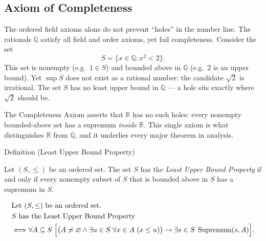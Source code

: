 \subsection*{Axiom of Completeness}


\begin{remark*}
The ordered field axioms alone do not prevent ``holes'' in the number line.
The rationals $\mathbb{Q}$ satisfy all field and order axioms, yet fail
completeness. Consider the set
\[
S = \{x \in \mathbb{Q} : x^2 < 2\}.
\]
This set is nonempty (e.g.\ $1 \in S$) and bounded above in $\mathbb{Q}$
(e.g.\ $2$ is an upper bound). Yet $\sup S$ does not exist as a rational
number: the candidate $\sqrt{2}$ is irrational. The set $S$ has no least
upper bound in $\mathbb{Q}$ --- a hole sits exactly where $\sqrt{2}$ should be.

The Completeness Axiom asserts that $\mathbb{R}$ has no such holes:
every nonempty bounded-above set has a supremum \emph{inside} $\mathbb{R}$.
This single axiom is what distinguishes $\mathbb{R}$ from $\mathbb{Q}$,
and it underlies every major theorem in analysis.
\end{remark*}


\begin{definitionbox}{Definition (Least Upper Bound Property)}
\begin{definition}
\label{def:least-upper-bound-property}
Let $(S,\le)$ be an ordered set. The set $S$ has the \emph{Least Upper Bound Property} if and only if every nonempty subset of $S$ that is bounded above in $S$ has a supremum in $S$.
\end{definition}
\end{definitionbox}

\begin{remark*}
\[
\begin{aligned}
&\text{Let }(S,\le)\text{ be an ordered set}.\\
&S\text{ has the Least Upper Bound Property}\\
&\Longleftrightarrow
\forall A\subseteq S\;
\Bigl[
\bigl(A\neq\varnothing \land \exists u\in S\;\forall x\in A\;(x\le u)\bigr)
\rightarrow
\exists s\in S\;\operatorname{Supremum}(s,A)
\Bigr].
\end{aligned}
\]
\end{remark*}

